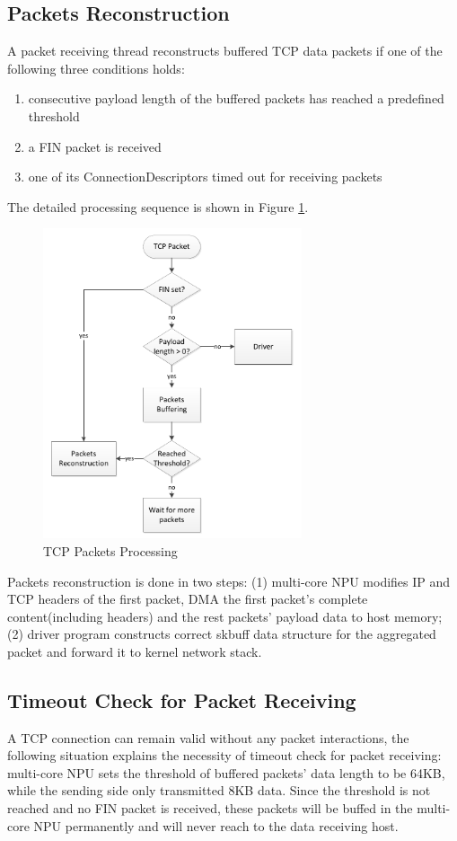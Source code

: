 \documentclass[conference]{IEEEtran}
\begin{document}
\subsection{Packets Reconstruction}
A packet receiving thread reconstructs buffered TCP data packets if one of the following three conditions holds:
\begin{enumerate}
\item consecutive payload length of the buffered packets has reached a predefined threshold
\item a FIN packet is received
\item one of its ConnectionDescriptors timed out for receiving packets
\end{enumerate}

The detailed processing sequence is shown in Figure \ref{tcp packets processing}.
\begin{figure}[!t]
\centering
\includegraphics[width=3.0in]{tcp_packets_processing}
\caption{TCP Packets Processing}
\label{tcp packets processing}
\end{figure}
Packets reconstruction is done in two steps: (1) multi-core NPU modifies IP and TCP headers of the first packet, DMA the first packet's complete content(including headers) and the rest packets' payload data to host memory; (2) driver program constructs correct skbuff data structure for the aggregated packet and forward it to kernel network stack.
\subsection{Timeout Check for Packet Receiving}
A TCP connection can remain valid without any packet interactions, the following situation explains the necessity of timeout check for packet receiving: multi-core NPU sets the threshold of buffered packets' data length to be 64KB, while the sending side only transmitted 8KB data. Since the threshold is not reached and no FIN packet is received, these packets will be buffed in the multi-core NPU permanently and will never reach to the data receiving host.
\end{document}
